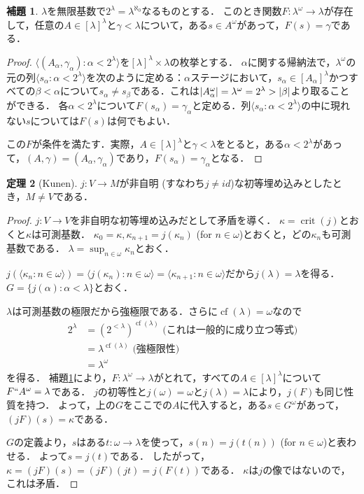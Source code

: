 \documentclass[uplatex]{jsarticle}
\newcommand{\cf}{\operatorname{cf}}
\newcommand{\crit}{\operatorname{crit}}
\newcommand{\seq}[1]{{\langle#1\rangle}}
\DeclarePairedDelimiter\abs{\lvert}{\rvert}
\theoremstyle{definition}
\newtheorem{thm}{定理}[section]
\newtheorem{lem}[thm]{補題}
\begin{document}
	\begin{lem}\label{lem:kunenslemma}
		$\lambda$を無限基数で$2^\lambda = \lambda^{\aleph_0}$なるものとする．
		このとき関数$F \colon \lambda^\omega \to \lambda$が存在して，任意の$A \in [\lambda]^\lambda$と$\gamma < \lambda$について，ある$s \in A^\omega$があって，$F(s) = \gamma$である．
	\end{lem}
	\begin{proof}
		$\seq{(A_\alpha, \gamma_\alpha) : \alpha < 2^\lambda}$を$[\lambda]^\lambda \times \lambda$の枚挙とする．
		$\alpha$に関する帰納法で，$\lambda^\omega$の元の列$\seq{s_\alpha : \alpha < 2^\lambda}$を次のように定める：$\alpha$ステージにおいて，$s_\alpha \in [A_\alpha]^\lambda$かつすべての$\beta < \alpha$について$s_\alpha \ne s_\beta$である．これは$\abs{A_\alpha^\omega} = \lambda^\omega = 2^\lambda > \abs{\beta}$より取ることができる．
		各$\alpha < 2^\lambda$について$F(s_\alpha) = \gamma_\alpha$と定める．列$\seq{s_\alpha : \alpha < 2^\lambda}$の中に現れない$s$については$F(s)$は何でもよい．
		
		この$F$が条件を満たす．実際，$A \in [\lambda]^\lambda$と$\gamma < \lambda$をとると，ある$\alpha < 2^\lambda$があって，$(A, \gamma) = (A_\alpha, \gamma_\alpha)$であり，$F(s_\alpha) = \gamma_\alpha$となる．
	\end{proof}

	\begin{thm}[Kunen]
		$j \colon V \to M$が非自明 (すなわち$j \ne id$)な初等埋め込みとしたとき，$M \ne V$である．
	\end{thm}
	\begin{proof}
		$j \colon V \to V$を非自明な初等埋め込みだとして矛盾を導く．
		$\kappa = \crit(j)$とおくと$\kappa$は可測基数．
		$\kappa_0 = \kappa, \kappa_{n+1} = j(\kappa_n)$ (for $n \in \omega$)とおくと，どの$\kappa_n$も可測基数である．
		$\lambda = \sup_{n \in \omega} \kappa_n$とおく．
		
		$j(\seq{\kappa_n : n \in \omega}) = \seq{j(\kappa_n) : n \in \omega} = \seq{\kappa_{n+1} : n \in \omega}$だから$j(\lambda) = \lambda$を得る．
		$G = \{ j(\alpha) : \alpha < \lambda \}$とおく．
		
		$\lambda$は可測基数の極限だから強極限である．さらに$\cf(\lambda) = \omega$なので
		\begin{align*}
			2^\lambda &= (2^{<\lambda})^{\cf(\lambda)} \text{ (これは一般的に成り立つ等式)} \\
			&= \lambda^{\cf(\lambda)} \text{ (強極限性)} \\
			&= \lambda^\omega		
		\end{align*}
		を得る．
		補題\ref{lem:kunenslemma}により，$F \colon \lambda^\omega \to \lambda$がとれて，すべての$A \in [\lambda]^\lambda$について$F``A^\omega = \lambda$である．
		$j$の初等性と$j(\omega) = \omega$と$j(\lambda) = \lambda$により，$j(F)$も同じ性質を持つ．
		よって，上の$G$をここでの$A$に代入すると，ある$s \in G^\omega$があって， $(jF)(s) = \kappa$である．
		
		$G$の定義より，$s$はある$t \colon \omega \to \lambda$を使って，$s(n) = j(t(n))$ (for $n\in\omega$)と表わせる．
		よって$s = j(t)$である．
		したがって，$\kappa = (jF)(s) = (jF)(jt) = j(F(t))$である．
		$\kappa$は$j$の像ではないので，これは矛盾．
	\end{proof}
\end{document}
